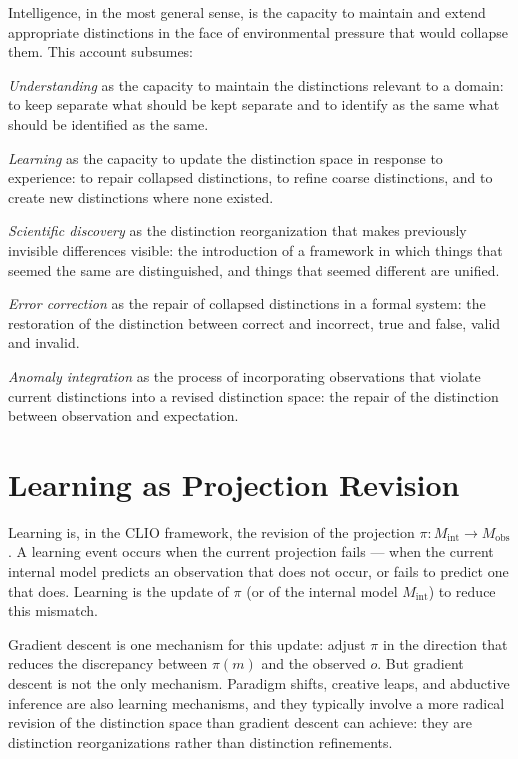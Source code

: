 \documentclass[12pt,a4paper]{book}
\theoremstyle{remark}
\theoremstyle{definition}
\begin{document}
Intelligence, in the most general sense, is the capacity to maintain and
extend appropriate distinctions in the face of environmental pressure
that would collapse them. This account subsumes:

\textit{Understanding} as the capacity to maintain the distinctions
relevant to a domain: to keep separate what should be kept separate and
to identify as the same what should be identified as the same.

\textit{Learning} as the capacity to update the distinction space in
response to experience: to repair collapsed distinctions, to refine
coarse distinctions, and to create new distinctions where none existed.

\textit{Scientific discovery} as the distinction reorganization that makes
previously invisible differences visible: the introduction of a framework
in which things that seemed the same are distinguished, and things that
seemed different are unified.

\textit{Error correction} as the repair of collapsed distinctions in a
formal system: the restoration of the distinction between correct and
incorrect, true and false, valid and invalid.

\textit{Anomaly integration} as the process of incorporating observations
that violate current distinctions into a revised distinction space: the
repair of the distinction between observation and expectation.

\section{Learning as Projection Revision}

Learning is, in the CLIO framework, the revision of the projection $\pi :
M_{\mathrm{int}} \to M_{\mathrm{obs}}$. A learning event occurs when the
current projection fails --- when the current internal model predicts an
observation that does not occur, or fails to predict one that does.
Learning is the update of $\pi$ (or of the internal model $M_{\mathrm{int}}$)
to reduce this mismatch.

Gradient descent is one mechanism for this update: adjust $\pi$ in the
direction that reduces the discrepancy between $\pi(m)$ and the observed
$o$. But gradient descent is not the only mechanism. Paradigm shifts,
creative leaps, and abductive inference are also learning mechanisms, and
they typically involve a more radical revision of the distinction space
than gradient descent can achieve: they are distinction reorganizations
rather than distinction refinements.
\end{document}
